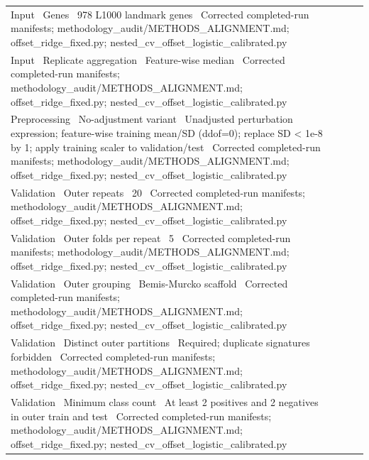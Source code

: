 \documentclass{article}
\begin{document}
\begin{tabular}{llll}
Input \ Genes \ 978 L1000 landmark genes \ Corrected completed-run manifests; methodology_audit/METHODS_ALIGNMENT.md; offset_ridge_fixed.py; nested_cv_offset_logistic_calibrated.py \\
Input \ Replicate aggregation \ Feature-wise median \ Corrected completed-run manifests; methodology_audit/METHODS_ALIGNMENT.md; offset_ridge_fixed.py; nested_cv_offset_logistic_calibrated.py \\
Preprocessing \ No-adjustment variant \ Unadjusted perturbation expression; feature-wise training mean/SD (ddof=0); replace SD < 1e-8 by 1; apply training scaler to validation/test \ Corrected completed-run manifests; methodology_audit/METHODS_ALIGNMENT.md; offset_ridge_fixed.py; nested_cv_offset_logistic_calibrated.py \\
Validation \ Outer repeats \ 20 \ Corrected completed-run manifests; methodology_audit/METHODS_ALIGNMENT.md; offset_ridge_fixed.py; nested_cv_offset_logistic_calibrated.py \\
Validation \ Outer folds per repeat \ 5 \ Corrected completed-run manifests; methodology_audit/METHODS_ALIGNMENT.md; offset_ridge_fixed.py; nested_cv_offset_logistic_calibrated.py \\
Validation \ Outer grouping \ Bemis-Murcko scaffold \ Corrected completed-run manifests; methodology_audit/METHODS_ALIGNMENT.md; offset_ridge_fixed.py; nested_cv_offset_logistic_calibrated.py \\
Validation \ Distinct outer partitions \ Required; duplicate signatures forbidden \ Corrected completed-run manifests; methodology_audit/METHODS_ALIGNMENT.md; offset_ridge_fixed.py; nested_cv_offset_logistic_calibrated.py \\
Validation \ Minimum class count \ At least 2 positives and 2 negatives in outer train and test \ Corrected completed-run manifests; methodology_audit/METHODS_ALIGNMENT.md; offset_ridge_fixed.py; nested_cv_offset_logistic_calibrated.py \\
\end{tabular}
\end{document}
